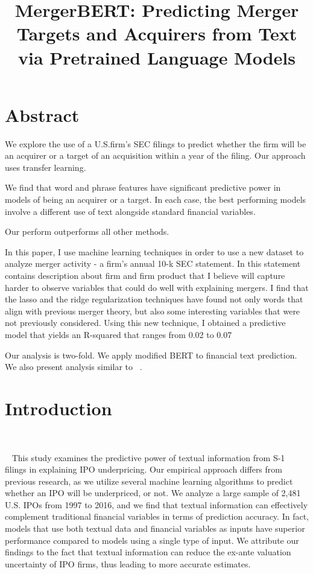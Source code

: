 \documentclass[11pt]{article}
\title{\vspace{-4cm} MergerBERT: Predicting Merger Targets and Acquirers from Text via Pretrained Language Models}
\author{}
\date{}
\begin{document}
\maketitle

\section{Abstract}

We explore the use of a U.S.firm's SEC filings to predict whether the firm will be
an acquirer or a target of an acquisition within a year of the
filing. Our approach uses transfer learning.

We find that word and phrase features have significant predictive power in models of being an acquirer or a target. In each case, the
best performing models involve a different use of text alongside
standard financial variables.

Our perform outperforms all other methods.

In this paper, I use machine learning techniques in order to use a new dataset to analyze
merger activity - a firm’s annual 10-k SEC statement. In this statement contains description
about firm and firm product that I believe will capture harder to observe variables that could
do well with explaining mergers. I find that the lasso and the ridge regularization techniques
have found not only words that align with previous merger theory, but also some interesting
variables that were not previously considered. Using this new technique, I obtained a predictive
model that yields an R-squared that ranges from 0.02 to 0.07

Our analysis is two-fold. We apply modified BERT to financial text
prediction. We also present analysis similar to ~\cite{moriarty2019}.


\section{Introduction}


~\cite{katsafados2019}


~\cite{katsafados2020}
This study examines the predictive power of textual information from S-1 filings in
explaining IPO underpricing. Our empirical approach differs from previous research, as we
utilize several machine learning algorithms to predict whether an IPO will be underpriced, or
not. We analyze a large sample of 2,481 U.S. IPOs from 1997 to 2016, and we find that
textual information can effectively complement traditional financial variables in terms of
prediction accuracy. In fact, models that use both textual data and financial variables as
inputs have superior performance compared to models using a single type of input. We
attribute our findings to the fact that textual information can reduce the ex-ante valuation
uncertainty of IPO firms, thus leading to more accurate estimates.
\end{document}
